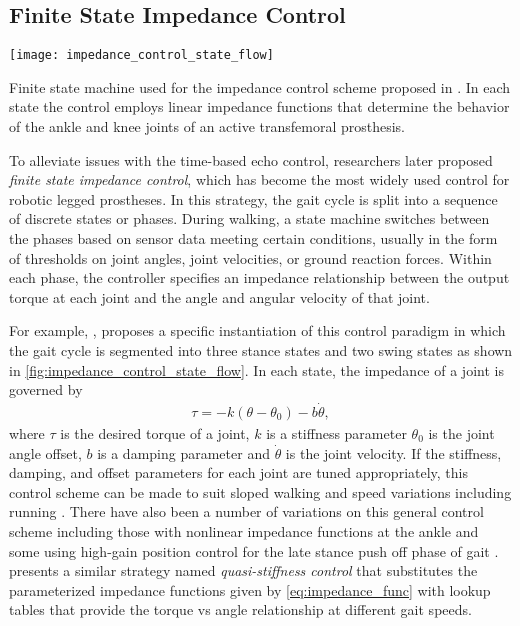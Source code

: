 \subsection{Finite State Impedance Control}\label{sec:back_walk_fsm}
\begin{marginfigure}
    \centering
    \texttt{[image: impedance\_control\_state\_flow]}
    \caption[Example finite state machine for the impedance control]{Finite
    state machine used for the impedance control scheme proposed in
    \citet{sup2009preliminary}. In each state the control employs linear
    impedance functions that determine the behavior of the ankle and knee joints
    of an active transfemoral
    prosthesis.}\label{fig:impedance_control_state_flow}
\end{marginfigure}
To alleviate issues with the time-based echo control, researchers later proposed
\emph{finite state impedance control}, which has become the most widely used
control for robotic legged prostheses. In this strategy, the gait cycle is split
into a sequence of discrete states or phases. During walking, a state machine
switches between the phases based on sensor data meeting certain conditions,
usually in the form of thresholds on joint angles, joint velocities, or ground
reaction forces. Within each phase, the controller specifies an impedance
relationship between the output torque at each joint and the angle and angular
velocity of that joint.

For example, \citet{sup2009preliminary}, proposes a specific instantiation of
this control paradigm in which the gait cycle is segmented into three stance
states and two swing states as shown in \cref{fig:impedance_control_state_flow}.
In each state, the impedance of a joint is governed by
\begin{align}
    \tau = -k (\theta - \theta_{0}) - b \dot \theta,\label{eq:impedance_func}
\end{align}
where $\tau$ is the desired torque of a joint, $k$ is a stiffness parameter
$\theta_{0}$ is the joint angle offset, $b$ is a damping parameter and $\dot
\theta$ is the joint velocity. If the stiffness, damping, and offset parameters
for each joint are tuned appropriately, this control scheme can be made to suit
sloped walking \citep{sup2011upslope} and speed variations
\citep{shultz2016variable} including running \citep{shultz2015running}. There
have also been a number of variations on this general control scheme including
those with nonlinear impedance functions at the ankle
\citep{sup2007design,shultz2014walking} and some using high-gain position
control for the late stance push off phase of gait \citep{lawson2014robotic}.
\citet{lenzi2014speed} presents a similar strategy named \emph{quasi-stiffness
control} that substitutes the parameterized impedance functions given by
\cref{eq:impedance_func} with lookup tables that provide the torque vs angle
relationship at different gait speeds. 

